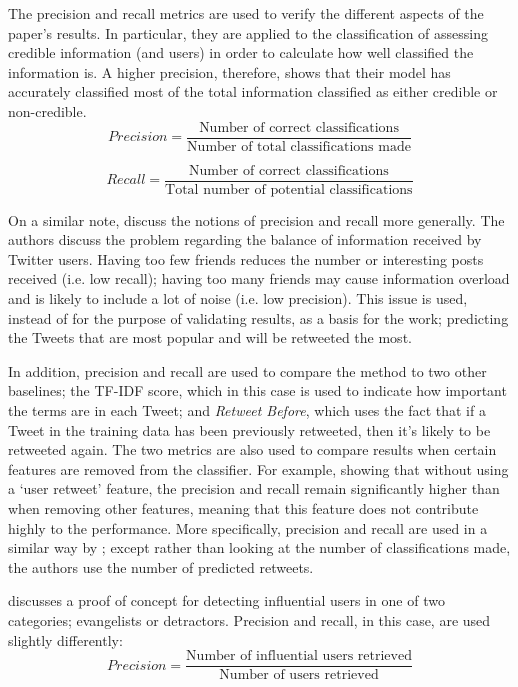 The precision and recall metrics are used to verify the different aspects of the paper's results. In particular, they are applied to the classification of assessing credible information (and users) in order to calculate how well classified the information is. A higher precision, therefore, shows that their model has accurately classified most of the total information classified as either credible or non-credible.
\[	
	Precision = \frac{\text{Number of correct classifications}}{\text{Number of total classifications made}}
\]

\[
	Recall = \frac{\text{Number of correct classifications}}{\text{Total number of potential classifications}}
\]

On a similar note, \citet{hong11} discuss the notions of precision and recall more generally. The authors discuss the problem regarding the balance of information received by Twitter users. Having too few friends reduces the number or interesting posts received (i.e. low recall); having too many friends may cause information overload and is likely to include a lot of noise (i.e. low precision). This issue is used, instead of for the purpose of validating results, as a basis for the work; predicting the Tweets that are most popular and will be retweeted the most.

In addition, precision and recall are used to compare the method to two other baselines; the TF-IDF score, which in this case is used to indicate how important the terms are in each Tweet; and \emph{Retweet Before}, which uses the fact that if a Tweet in the training data has been previously retweeted, then it's likely to be retweeted again. The two metrics are also used to compare results when certain features are removed from the classifier. For example, showing that without using a `user retweet' feature, the precision and recall remain significantly higher than when removing other features, meaning that this feature does not contribute highly to the performance. More specifically, precision and recall are used in a similar way by \citet{castillo11}; except rather than looking at the number of classifications made, the authors use the number of predicted retweets.

\cite{bigonha10} discusses a proof of concept for detecting influential users in one of two categories; evangelists or detractors. Precision and recall, in this case, are used slightly differently:
\[	
	Precision = \frac{\text{Number of influential users retrieved}}{\text{Number of users retrieved}}
\]

